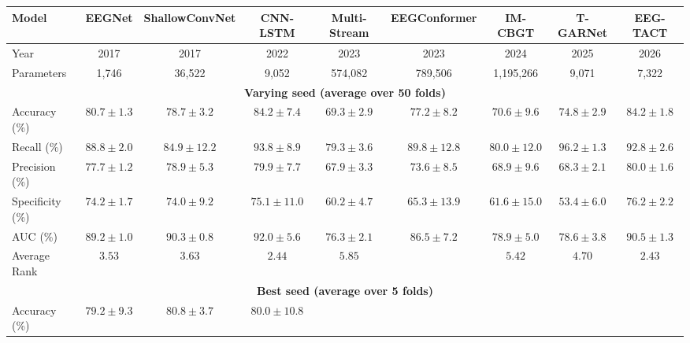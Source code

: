 \begin{tabular}{lcccccccc}
\toprule
\textbf{Model}
& \textbf{EEGNet}
& \textbf{ShallowConvNet}
& \textbf{CNN-LSTM}
& \textbf{Multi-Stream}
& \textbf{EEGConformer}
& \textbf{IM-CBGT}
& \textbf{T-GARNet}
& \textbf{EEG-TACT}\\
\midrule
Year
& 2017
& 2017
& 2022
& 2023
& 2023
& 2024
& 2025
& 2026\\
Parameters
& 1{,}746
& 36{,}522
& 9{,}052
& 574{,}082
& 789{,}506
& 1{,}195{,}266
& 9{,}071
& 7{,}322\\
\midrule
\multicolumn{9}{c}{\textbf{Varying seed (average over 50 folds)}} \\
\midrule
Accuracy (\%)
& \cellcolor{lightgray}${80.7 \pm 1.3}$
& \cellcolor{lightgray}${78.7 \pm 3.2}$
& ${\mathbf{84.2 \pm 7.4}}$
& \cellcolor{lightgray}${69.3 \pm 2.9}$
& \cellcolor{lightgray}${77.2 \pm 8.2}$
& \cellcolor{lightgray}${70.6 \pm 9.6}$
& \cellcolor{lightgray}${74.8 \pm 2.9}$
& ${\mathbf{84.2 \pm 1.8}}$\\
Recall (\%)
& \cellcolor{lightgray}${88.8 \pm 2.0}$
& \cellcolor{lightgray}${84.9 \pm 12.2}$
& ${93.8 \pm 8.9}$
& \cellcolor{lightgray}${79.3 \pm 3.6}$
& ${89.8 \pm 12.8}$
& \cellcolor{lightgray}${80.0 \pm 12.0}$
& ${\mathbf{96.2 \pm 1.3}}$
& ${92.8 \pm 2.6}$\\
Precision (\%)
& \cellcolor{lightgray}${77.7 \pm 1.2}$
& ${78.9 \pm 5.3}$
& ${79.9 \pm 7.7}$
& \cellcolor{lightgray}${67.9 \pm 3.3}$
& \cellcolor{lightgray}${73.6 \pm 8.5}$
& \cellcolor{lightgray}${68.9 \pm 9.6}$
& \cellcolor{lightgray}${68.3 \pm 2.1}$
& ${\mathbf{80.0 \pm 1.6}}$\\
Specificity (\%)
& ${74.2 \pm 1.7}$
& ${74.0 \pm 9.2}$
& ${75.1 \pm 11.0}$
& \cellcolor{lightgray}${60.2 \pm 4.7}$
& \cellcolor{lightgray}${65.3 \pm 13.9}$
& \cellcolor{lightgray}${61.6 \pm 15.0}$
& \cellcolor{lightgray}${53.4 \pm 6.0}$
& ${\mathbf{76.2 \pm 2.2}}$\\
AUC (\%)
& \cellcolor{lightgray}${89.2 \pm 1.0}$
& ${90.3 \pm 0.8}$
& ${\mathbf{92.0 \pm 5.6}}$
& \cellcolor{lightgray}${76.3 \pm 2.1}$
& \cellcolor{lightgray}${86.5 \pm 7.2}$
& \cellcolor{lightgray}${78.9 \pm 5.0}$
& \cellcolor{lightgray}${78.6 \pm 3.8}$
& ${90.5 \pm 1.3}$\\
Average Rank
& $3.53$
& $3.63$
& $2.44$
& $5.85$
& 
& $5.42$
& $4.70$
& $\mathbf{2.43}$\\
\midrule
\multicolumn{9}{c}{\textbf{Best seed (average over 5 folds)}} \\
\midrule
Accuracy (\%)
& ${79.2 \pm 9.3}$
& ${80.8 \pm 3.7}$
& ${80.0 \pm 10.8}$

\end{tabular}

